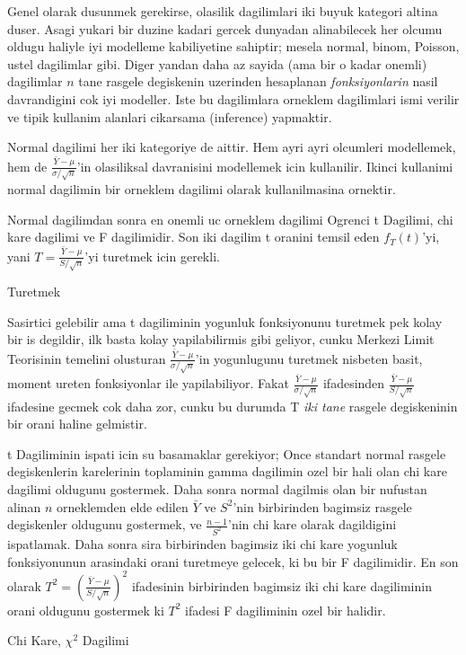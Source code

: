 \documentclass[12pt,fleqn]{article}\usepackage{../common}
\begin{document}
Genel olarak dusunmek gerekirse, olasilik dagilimlari iki buyuk kategori
altina duser. Asagi yukari bir duzine kadari gercek dunyadan alinabilecek
her olcumu oldugu haliyle iyi modelleme kabiliyetine sahiptir; mesela
normal, binom, Poisson, ustel dagilimlar gibi. Diger yandan daha az sayida
(ama bir o kadar onemli) dagilimlar $n$ tane rasgele degiskenin uzerinden
hesaplanan {\em fonksiyonlarin} nasil davrandigini cok iyi modeller. Iste
bu dagilimlara orneklem dagilimlari ismi verilir ve tipik kullanim alanlari
cikarsama (inference) yapmaktir.

Normal dagilimi her iki kategoriye de aittir. Hem ayri ayri olcumleri
modellemek, hem de $\frac{\bar{Y}-\mu}{\sigma / \sqrt{n}}$'in olasiliksal davranisini modellemek icin kullanilir. 
Ikinci kullanimi normal dagilimin bir orneklem dagilimi olarak kullanilmasina 
ornektir. 

Normal dagilimdan sonra en onemli uc orneklem dagilimi Ogrenci t Dagilimi,
chi kare dagilimi ve F dagilimidir. Son iki dagilim t oranini temsil eden
$f_T(t)$'yi, yani $T = \frac{\bar{Y}-\mu}{S / \sqrt{n}}$'yi turetmek icin gerekli.

Turetmek 

Sasirtici gelebilir ama t dagiliminin yogunluk fonksiyonunu turetmek pek
kolay bir is degildir, ilk basta kolay yapilabilirmis gibi geliyor, cunku
Merkezi Limit Teorisinin temelini olusturan $\frac{\bar{Y}-\mu}{\sigma /
  \sqrt{n}}$'in yogunlugunu turetmek nisbeten basit, moment ureten
fonksiyonlar ile yapilabiliyor. Fakat $\frac{\bar{Y}-\mu}{\sigma /
  \sqrt{n}}$ ifadesinden $\frac{\bar{Y}-\mu}{S / \sqrt{n}}$ ifadesine
gecmek cok daha zor, cunku bu durumda T {\em iki tane} rasgele degiskeninin
bir orani haline gelmistir.

t Dagiliminin ispati icin su basamaklar gerekiyor; Once standart normal
rasgele degiskenlerin karelerinin toplaminin gamma dagilimin ozel bir hali
olan chi kare dagilimi oldugunu gostermek. Daha sonra normal dagilmis olan
bir nufustan alinan $n$ orneklemden elde edilen $\bar{Y}$ ve $S^2$'nin
birbirinden bagimsiz rasgele degiskenler oldugunu gostermek, ve
$\frac{n-1}{S^2}$'nin chi kare olarak dagildigini ispatlamak. Daha sonra
sira birbirinden bagimsiz iki chi kare yogunluk fonksiyonunun arasindaki
orani turetmeye gelecek, ki bu bir F dagilimidir. En son olarak $T^2
=(\frac{\bar{Y}-\mu}{S / \sqrt{n}})^2$ ifadesinin 
birbirinden bagimsiz iki chi kare dagiliminin orani oldugunu gostermek ki
$T^2$  ifadesi F dagiliminin ozel bir halidir.

Chi Kare, $\chi^2$ Dagilimi
\end{document}

